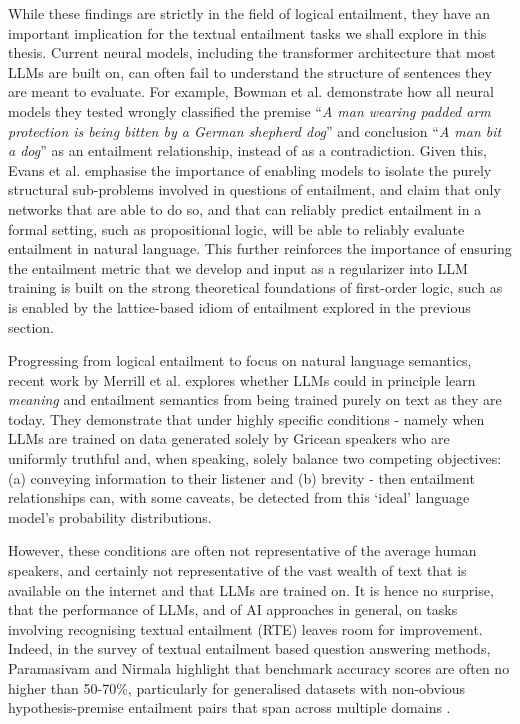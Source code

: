 \documentclass[12pt,twoside]{report}
\begin{document}
While these findings are strictly in the field of logical entailment, they have an important implication for the textual entailment tasks we shall explore in this thesis. Current neural models, including the transformer architecture that most LLMs are built on, can often fail to understand the structure of sentences they are meant to evaluate. For example, Bowman et al. \cite{bowman2015} demonstrate how all neural models they tested wrongly classified the premise ``\textit{A man wearing padded arm protection is being bitten by a German shepherd dog}'' and conclusion ``\textit{A man bit a dog}'' as an entailment relationship, instead of as a contradiction. Given this, Evans et al. \cite{Evans2018} emphasise the importance of enabling models to isolate the purely structural sub-problems involved in questions of entailment, and claim that only networks that are able to do so, and that can reliably predict entailment in a formal setting, such as propositional  logic, will be able to reliably evaluate entailment in natural language. This further reinforces the importance of ensuring the entailment metric that we develop and input as a regularizer into LLM training is built on the strong theoretical foundations of first-order logic, such as is enabled by the lattice-based idiom of entailment explored in the previous section. \newline \par

Progressing from logical entailment to focus on natural language semantics, recent work by Merrill et al. \cite{merrill-etal-2022-entailment} explores whether LLMs could in principle learn \textit{meaning} and entailment semantics from being trained purely on text as they are today. They demonstrate that under highly specific conditions - namely when LLMs are trained on data generated solely by Gricean speakers who are uniformly truthful and, when speaking, solely balance two competing objectives: (a) conveying information to their listener and (b) brevity - then entailment relationships can, with some caveats, be detected from this `ideal' language model's probability distributions. \newline \par

However, these conditions are often not representative of the average human speakers, and certainly not representative of the vast wealth of text that is available on the internet and that LLMs are trained on. It is hence no surprise, that the performance of LLMs, and of AI approaches in general, on tasks involving recognising textual entailment (RTE) leaves room for improvement. Indeed, in the survey of textual entailment based question answering methods, Paramasivam and Nirmala highlight that benchmark accuracy scores are often no higher than 50-70\%, particularly for generalised datasets with non-obvious hypothesis-premise entailment pairs that span across multiple domains \cite{PARAMASIVAM20229644}. 
\end{document}
